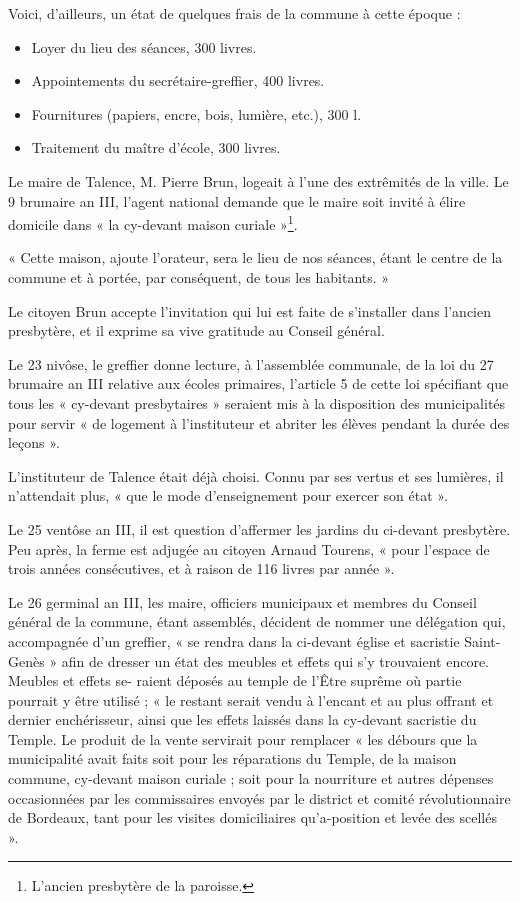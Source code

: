 \documentclass[a4paper,11pt]{book}
\begin{document}
Voici, d'ailleurs, un état de quelques frais de la commune à cette époque :

\begin{itemize}
\item Loyer du lieu des séances, 300 livres.
\item Appointements du secrétaire-greffier, 400 livres.
\item Fournitures (papiers, encre, bois, lumière, etc.), 300 l.
\item Traitement du maître d'école, 300 livres.
\end{itemize}

Le maire de Talence, M. Pierre Brun, logeait à l'une des extrêmités de la ville. Le 9 brumaire an III, l'agent national demande que le maire soit invité à élire domicile dans « la cy-devant maison curiale »\footnote{L'ancien presbytère de la paroisse.}.

« Cette maison, ajoute l'orateur, sera le lieu de nos séances, étant le centre de la commune et à portée, par conséquent, de tous les habitants. »

Le citoyen Brun accepte l'invitation qui lui est faite de s'installer dans l'ancien presbytère, et il exprime sa vive gratitude au Conseil général.

Le 23 nivôse, le greffier donne lecture, à l'assemblée communale, de la loi du 27 brumaire an III relative aux écoles primaires, l'article 5 de cette loi spécifiant que tous les « cy-devant presbytaires » seraient mis à la disposition des municipalités pour servir « de logement à l'instituteur et abriter les élèves pendant la durée des leçons ».

L'instituteur de Talence était déjà choisi. Connu par ses vertus et ses lumières, il n'attendait plus, « que le mode d'enseignement pour exercer son état ».

Le 25 ventôse an III, il est question d'affermer les jardins du ci-devant presbytère. Peu après, la ferme est adjugée au citoyen Arnaud Tourens, « pour l'espace de trois
années consécutives, et à raison de 116 livres par année ».

Le 26 germinal an III, les maire, officiers municipaux et membres du Conseil général de la commune, étant assemblés, décident de nommer une délégation qui, accompagnée d'un greffier, « se rendra dans la ci-devant église et sacristie Saint-Genès » afin de dresser un état des meubles et effets qui s'y trouvaient encore. Meubles et effets se-
raient déposés au temple de l'Être suprême où partie pourrait y être utilisé ; « le restant serait vendu à l'encant et au plus offrant et dernier enchérisseur, ainsi que les effets laissés dans la cy-devant sacristie du Temple. Le produit de la vente servirait pour remplacer « les débours que la municipalité avait faits soit pour les réparations du Temple, de la maison commune, cy-devant maison curiale ; soit pour la nourriture et autres dépenses occasionnées par les commissaires envoyés par le district et comité révolutionnaire de Bordeaux, tant pour les visites domiciliaires qu'a-position et levée des scellés ».
\end{document}
